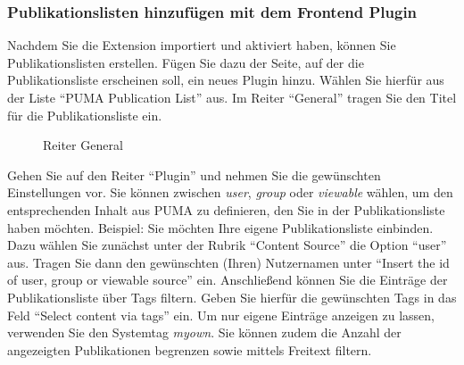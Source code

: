 \subsubsection*{Publikationslisten hinzufügen mit dem Frontend Plugin}\label{sss:typo3Publikationslisten}
Nachdem Sie die Extension importiert und aktiviert haben, können Sie Publikationslisten erstellen. Fügen Sie dazu der Seite, auf der die Publikationsliste erscheinen soll, ein neues Plugin hinzu. Wählen Sie hierfür aus der Liste \enquote{PUMA Publication List} aus.\newline
\newline
Im Reiter \enquote{General} tragen Sie den Titel für die Publikationsliste ein.
\begin{figure}[h!]
 \centering
 \caption{Reiter General}
 \label{fig:reiterGeneral}
\end{figure}
\newline \newline
Gehen Sie auf den Reiter \enquote{Plugin} und nehmen Sie die gewünschten Einstellungen vor. Sie können zwischen \textit{user}, \textit{group} oder \textit{viewable} wählen, um den entsprechenden Inhalt aus PUMA zu definieren, den Sie in der Publikationsliste haben möchten.\newline
\newline
Beispiel: Sie möchten Ihre eigene Publikationsliste einbinden. Dazu wählen Sie zunächst unter der Rubrik \enquote{Content Source} die Option \enquote{user} aus. Tragen Sie dann den gewünschten (Ihren) Nutzernamen unter \enquote{Insert the id of user, group or viewable source} ein. Anschließend können Sie die Einträge der Publikationsliste über Tags filtern. Geben Sie hierfür die gewünschten Tags in das Feld \enquote{Select content via tags} ein. Um nur eigene Einträge anzeigen zu lassen, verwenden Sie den Systemtag \textit{myown}. Sie können zudem die Anzahl der angezeigten Publikationen begrenzen sowie mittels Freitext filtern.
